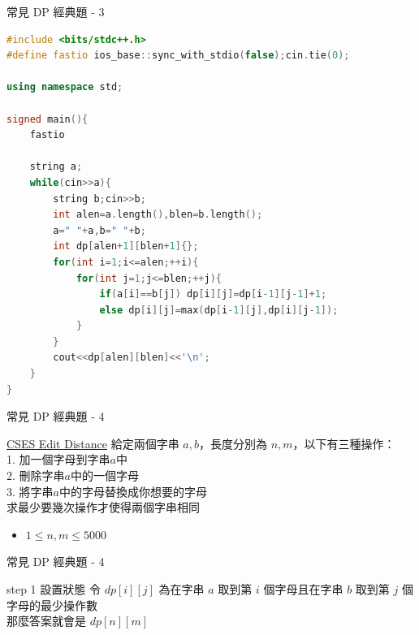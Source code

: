 \documentclass[aspectratio=169]{beamer}
\begin{document}
    \begin{frame}[fragile]{常見 DP 經典題 - 3}
        \begin{lstlisting}[language=C++, basicstyle=\ttfamily\tiny]
#include <bits/stdc++.h>
#define fastio ios_base::sync_with_stdio(false);cin.tie(0);

using namespace std;

signed main(){
    fastio

    string a;
    while(cin>>a){
        string b;cin>>b;
        int alen=a.length(),blen=b.length();
        a=" "+a,b=" "+b;
        int dp[alen+1][blen+1]{};
        for(int i=1;i<=alen;++i){
            for(int j=1;j<=blen;++j){
                if(a[i]==b[j]) dp[i][j]=dp[i-1][j-1]+1;
                else dp[i][j]=max(dp[i-1][j],dp[i][j-1]);
            }
        }
        cout<<dp[alen][blen]<<'\n';
    }
}
        \end{lstlisting}
    \end{frame}
    
    \begin{frame}{常見 DP 經典題 - 4}
        \begin{block}{\href{https://cses.fi/problemset/task/1639/}{CSES Edit Distance}}
            給定兩個字串 $a, b$，長度分別為 $n, m$，以下有三種操作： \\
            1. 加一個字母到字串$a$中 \\
            2. 刪除字串$a$中的一個字母 \\
            3. 將字串$a$中的字母替換成你想要的字母 \\
            求最少要幾次操作才使得兩個字串相同 \\
            \vspace{2.5mm}
            \begin{itemize}
                \item $1 \leq n, m \leq 5000$
            \end{itemize}
        \end{block}
    \end{frame}

    \begin{frame}{常見 DP 經典題 - 4}
        \begin{alertblock}{step 1 設置狀態}
            令 $dp[i][j]$ 為在字串 $a$ 取到第 $i$ 個字母且在字串 $b$ 取到第 $j$ 個字母的最少操作數 \\
            \vspace{2mm}
            那麼答案就會是 $dp[n][m]$
        \end{alertblock}
    \end{frame}
\end{document}
